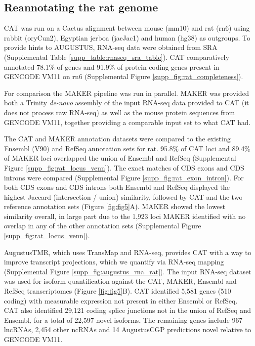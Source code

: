 \documentclass[fleqn,10pt]{wlscirep}
\begin{document}
\subsection{Reannotating the rat genome}
	CAT was run on a Cactus alignment between mouse (mm10) and rat (rn6) using rabbit (oryCun2), Egyptian jerboa (jacJac1) and human (hg38) as outgroups. To provide hints to AUGUSTUS, RNA-seq data were obtained from SRA \cite{fushan2015gene,cortez2014origins,liu2016identification} (Supplemental Table \ref{supp_table:rnaseq_sra_table}). CAT comparatively annotated 78.1\% of genes and 91.9\% of protein coding genes present in GENCODE VM11 on rn6 (Supplemental Figure \ref{supp_fig:rat_completeness}). 
    
For comparison the MAKER pipeline \cite{cantarel2008maker} was run in parallel. MAKER was provided both a Trinity \cite{haas2013novo} \textit{de-novo} assembly of the input RNA-seq data provided to CAT (it does not process raw RNA-seq) as well as the mouse protein sequences from GENCODE VM11, together providing a comparable input set to what CAT had. 

The CAT and MAKER annotation datasets were compared to the existing Ensembl (V90) and RefSeq annotation sets for rat. 95.8\% of CAT loci and 89.4\% of MAKER loci overlapped the union of Ensembl and RefSeq (Supplemental Figure \ref{supp_fig:rat_locus_venn}). The exact matches of CDS exons and CDS introns were compared (Supplemental Figure \ref{supp_fig:rat_exon_intron}). For both CDS exons and CDS introns both Ensembl and RefSeq displayed the highest Jaccard (intersection / union) similarity, followed by CAT and the two reference annotation sets (Figure \ref{fig:fig5}A). MAKER showed the lowest similarity overall, in large part due to the 1,923 loci MAKER identified with no overlap in any of the other annotation sets (Supplemental Figure \ref{supp_fig:rat_locus_venn}). 

AugustusTMR, which uses TransMap and RNA-seq, provides CAT with a way to improve transcript projections, which we quantify via RNA-seq mapping (Supplemental Figure \ref{supp_fig:augustus_rna_rat}). The input RNA-seq dataset was used for isoform quantification against the CAT, MAKER, Ensembl and RefSeq transcriptomes (Figure \ref{fig:fig5}B). CAT identified 5,581 genes (510 coding) with measurable expression not present in either Ensembl or RefSeq. CAT also identified 29,121 coding splice junctions not in the union of RefSeq and Ensembl, for a total of 22,597 novel isoforms. The remaining genes include 967 lncRNAs, 2,454 other ncRNAs and 14 AugustusCGP predictions novel relative to GENCODE VM11.
\end{document}
